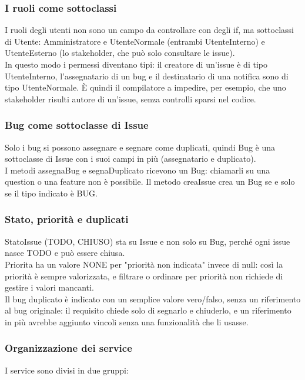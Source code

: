 \subsubsection{I ruoli come sottoclassi}
I ruoli degli utenti non sono un campo da controllare con degli if, ma sottoclassi 
di Utente: Amministratore e UtenteNormale (entrambi UtenteInterno) e UtenteEsterno
 (lo stakeholder, che può solo consultare le issue). \\
 \indent In questo modo i permessi 
 diventano tipi: il creatore di un'issue è di tipo UtenteInterno, l'assegnatario di 
 un bug e il destinatario di una notifica sono di tipo UtenteNormale. È quindi il 
 compilatore a impedire, per esempio, che uno stakeholder risulti autore di un'issue, 
 senza controlli sparsi nel codice. 

 \subsubsection{Bug come sottoclasse di Issue }
 Solo i bug si possono assegnare e segnare come duplicati, quindi Bug è 
 una sottoclasse di Issue con i suoi campi in più (assegnatario e duplicato). \\
 \indent I metodi assegnaBug e segnaDuplicato ricevono un Bug: chiamarli su una question
  o una feature non è possibile. Il metodo creaIssue crea un Bug se e solo se 
  il tipo indicato è BUG. 

\subsubsection{Stato, priorità e duplicati }
 StatoIssue (TODO, CHIUSO) sta su Issue e non solo su Bug, perché 
 ogni issue nasce TODO e può essere chiusa. \\
\indent Priorita ha un valore NONE per "priorità non indicata" 
invece di null: così la priorità è sempre valorizzata, e filtrare o ordinare 
per priorità non richiede di gestire i valori mancanti. \\
\indent Il bug duplicato è indicato con un semplice valore vero/falso, senza un 
riferimento al bug originale: il requisito chiede solo di segnarlo e chiuderlo,
 e un riferimento in più avrebbe aggiunto vincoli senza una funzionalità che li usasse. 

\subsubsection{ Organizzazione dei service}
I service sono divisi in due gruppi: 

